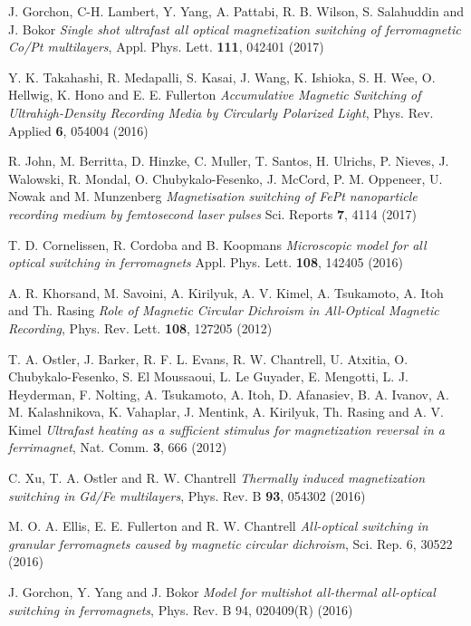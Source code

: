 \documentclass[5p]{elsarticle}
\begin{document}
\begin{thebibliography}{}
J. Gorchon, C-H. Lambert, Y. Yang, A. Pattabi, R. B. Wilson, S. Salahuddin and J. Bokor \emph{Single shot ultrafast all optical magnetization switching of ferromagnetic Co/Pt multilayers}, Appl. Phys. Lett. \textbf{111}, 042401 (2017)

Y. K. Takahashi, R. Medapalli, S. Kasai, J. Wang, K. Ishioka, S. H. Wee, O. Hellwig, K. Hono and E. E. Fullerton \emph{Accumulative Magnetic Switching of Ultrahigh-Density Recording Media by Circularly Polarized Light}, Phys. Rev. Applied \textbf{6}, 054004 (2016)

R. John, M. Berritta, D. Hinzke, C. Muller, T. Santos, H. Ulrichs, P. Nieves, J. Walowski, R. Mondal, O. Chubykalo-Fesenko, J. McCord, P. M. Oppeneer, U. Nowak and M. Munzenberg \emph{Magnetisation switching of FePt nanoparticle recording medium by femtosecond laser pulses} Sci. Reports \textbf{7}, 4114 (2017)

T. D. Cornelissen, R. Cordoba and B. Koopmans \emph{Microscopic model for all optical switching in ferromagnets} Appl. Phys. Lett. \textbf{108}, 142405 (2016)

A. R. Khorsand, M. Savoini, A. Kirilyuk, A. V. Kimel, A. Tsukamoto, A. Itoh and Th. Rasing \emph{Role of Magnetic Circular Dichroism in All-Optical Magnetic Recording}, Phys. Rev. Lett. \textbf{108}, 127205 (2012)

T. A. Ostler, J. Barker, R. F. L. Evans, R. W. Chantrell, U. Atxitia, O. Chubykalo-Fesenko, S. El Moussaoui, L. Le Guyader, E. Mengotti, L. J. Heyderman, F. Nolting, A. Tsukamoto, A. Itoh, D. Afanasiev, B. A. Ivanov, A. M. Kalashnikova, K. Vahaplar, J. Mentink, A. Kirilyuk, Th. Rasing and A. V. Kimel \emph{Ultrafast heating as a sufficient stimulus for magnetization reversal in a ferrimagnet}, Nat. Comm. \textbf{3}, 666 (2012)

C. Xu, T. A. Ostler and R. W. Chantrell \emph{Thermally induced magnetization switching in Gd/Fe multilayers}, Phys. Rev. B \textbf{93}, 054302 (2016)

M. O. A. Ellis, E. E. Fullerton and R. W. Chantrell \emph{All-optical switching in granular ferromagnets caused by magnetic circular dichroism}, Sci. Rep. 6, 30522 (2016)

J. Gorchon, Y. Yang and J. Bokor \emph{Model for multishot all-thermal all-optical switching in ferromagnets}, Phys. Rev. B 94, 020409(R) (2016)


\end{thebibliography}
\end{document}
